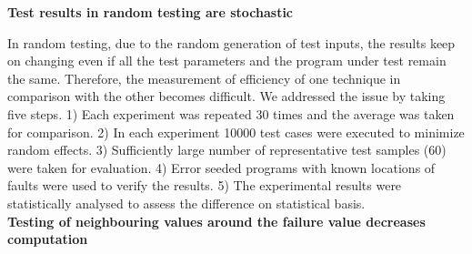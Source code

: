








\textbf{Test results in random testing are stochastic} 

In random testing, due to the random generation of test inputs, the results keep on changing even if all the test parameters and the program under test remain the same. Therefore, the measurement of efficiency of one technique in comparison with the other becomes difficult. We addressed  the issue by taking five steps. 1) Each experiment was repeated 30 times and the average was taken for comparison. 2) In each experiment 10000 test cases were executed to minimize random effects. 3) Sufficiently large number of representative test samples (60) were taken for evaluation. 4) Error seeded programs with known locations of faults were used to verify the results. 5) The experimental results were statistically analysed to assess the difference on statistical basis.\\


   
\textbf{Testing of neighbouring values around the failure value decreases computation}

